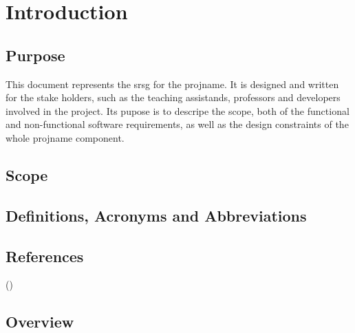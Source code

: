 \section{Introduction}
\subsection{Purpose}
This document represents the \gls{srsg} for the \gls{projname}. It is designed and written for the stake holders, such as the teaching assistands, professors and developers involved in the project. Its
pupose is to descripe the scope, both of the functional and non-functional software requirements, as well as the design constraints of the whole \gls{projname} component.
\subsection{Scope}
\subsection{Definitions, Acronyms and Abbreviations}
\printglossary[type=\acronymtype]
\printglossary
\subsection{References}
(\cite{IEEE830:1998})

\subsection{Overview}
